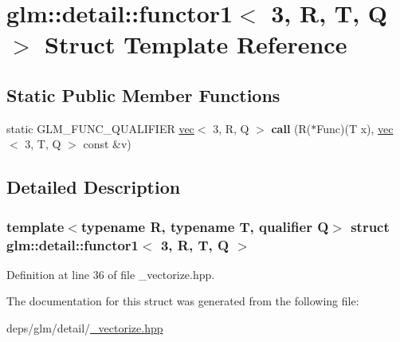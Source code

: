 \hypertarget{structglm_1_1detail_1_1functor1_3_013_00_01R_00_01T_00_01Q_01_4}{}\section{glm\+:\+:detail\+:\+:functor1$<$ 3, R, T, Q $>$ Struct Template Reference}
\label{structglm_1_1detail_1_1functor1_3_013_00_01R_00_01T_00_01Q_01_4}
\subsection*{Static Public Member Functions}
\begin{DoxyCompactItemize}
\item 
\mbox{\label{structglm_1_1detail_1_1functor1_3_013_00_01R_00_01T_00_01Q_01_4_a89ea8c7ead27b1a70ac9830eba529000}} 
static G\+L\+M\+\_\+\+F\+U\+N\+C\+\_\+\+Q\+U\+A\+L\+I\+F\+I\+ER \hyperlink{structglm_1_1vec}{vec}$<$ 3, R, Q $>$ {\bfseries call} (R($\ast$Func)(T x), \hyperlink{structglm_1_1vec}{vec}$<$ 3, T, Q $>$ const \&v)
\end{DoxyCompactItemize}


\subsection{Detailed Description}
\subsubsection*{template$<$typename R, typename T, qualifier Q$>$\newline
struct glm\+::detail\+::functor1$<$ 3, R, T, Q $>$}



Definition at line 36 of file \+\_\+vectorize.\+hpp.



The documentation for this struct was generated from the following file\+:\begin{DoxyCompactItemize}
\item 
deps/glm/detail/\hyperlink{__vectorize_8hpp}{\+\_\+vectorize.\+hpp}\end{DoxyCompactItemize}
